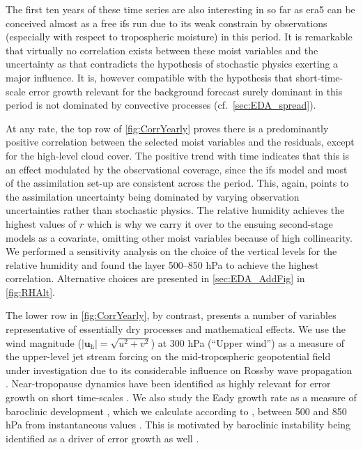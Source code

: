 The first ten years of these time series are also interesting in so far as \gls{era5} can be conceived almost as a free \gls{ifs} run due to its weak constrain by observations (especially with respect to tropospheric moisture) in this period. It is remarkable that virtually no correlation exists between these moist variables and the uncertainty as that contradicts the hypothesis of stochastic physics exerting a major influence. It is, however compatible with the hypothesis that short-time-scale error growth relevant for the background forecast surely dominant in this period is not dominated by convective processes (cf.~\cref{sec:EDA_spread}).

At any rate, the top row of \cref{fig:CorrYearly} proves there is a predominantly positive correlation between the selected moist variables and the residuals, except for the high-level cloud cover. The positive trend with time indicates that this is an effect modulated by the observational coverage, since the \gls{ifs} model and most of the assimilation set-up are consistent across the period. This, again, points to the assimilation uncertainty being dominated by varying observation uncertainties rather than stochastic physics. The relative humidity achieves the highest values of $r$ which is why we carry it over to the ensuing second-stage models as a covariate, omitting other moist variables because of high collinearity. We performed a sensitivity analysis on the choice of the vertical levels for the relative humidity and found the layer 500--850 hPa to achieve the highest correlation. Alternative choices are presented in \cref{sec:EDA_AddFig} in \cref{fig:RHAlt}.

The lower row in \cref{fig:CorrYearly}, by contrast, presents a number of variables representative of essentially dry processes and mathematical effects. We use the wind magnitude ($|\mathbf{u}_{\mathrm{h}}| = \sqrt{u^2 + v^2}$) at 300 hPa (\enquote{Upper wind}) as a measure of the upper-level jet stream forcing on the mid-tropospheric geopotential field under investigation due to its considerable influence on Rossby wave propagation \parencite{wirthRossbyWavePackets2018}. Near-tropopause dynamics have been identified as highly relevant for error growth on short time-scales \parencite{baumgartPotentialVorticityDynamics2018, baumgartQuantitativeViewProcesses2019}. We also study the Eady growth rate as a measure of baroclinic development \parencite{eadyLongWavesCyclone1949, pierrehumbertBaroclinicInstability1995}, which we calculate according to \textcite{hoskinsExistenceStormtracks1990}, between 500 and 850 hPa from instantaneous values \parencite{simmondsBiasesCalculationSouthern2009}. This is motivated by baroclinic instability being identified as a driver of error growth as well \parencite{selzTransitionPracticalIntrinsic2022, rodwellUncertaintyGrowthForecast2023}.

